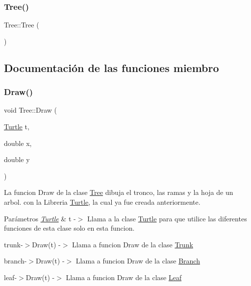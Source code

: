 \subsubsection{\texorpdfstring{Tree()}{Tree()}}
{\footnotesize\ttfamily Tree\+::\+Tree (\begin{DoxyParamCaption}{ }\end{DoxyParamCaption})\hspace{0.3cm}{\ttfamily [inline]}}



\subsection{Documentación de las funciones miembro}
\mbox{\label{class_tree_a76dc7e174c3c98b7e3b3839cdafa8a92}} 
\subsubsection{\texorpdfstring{Draw()}{Draw()}}
{\footnotesize\ttfamily void Tree\+::\+Draw (\begin{DoxyParamCaption}\item[{\mbox{\hyperlink{class_turtle}{Turtle}}}]{t,  }\item[{double}]{x,  }\item[{double}]{y }\end{DoxyParamCaption})\hspace{0.3cm}{\ttfamily [inline]}}



La funcion Draw de la clase \mbox{\hyperlink{class_tree}{Tree}} dibuja el tronco, las ramas y la hoja de un arbol. con la Libreria \mbox{\hyperlink{class_turtle}{Turtle}}, la cual ya fue creada anteriormente. 


\begin{DoxyParams}{Parámetros}
{\em \mbox{\hyperlink{class_turtle}{Turtle}}} & t -\/$>$ Llama a la clase \mbox{\hyperlink{class_turtle}{Turtle}} para que utilice las diferentes funciones de esta clase solo en esta funcion. \\
\hline
\end{DoxyParams}
trunk-\/$>$Draw(t) -\/$>$ Llama a funcion Draw de la clase \mbox{\hyperlink{class_trunk}{Trunk}}

branch-\/$>$Draw(t) -\/$>$ Llama a funcion Draw de la clase \mbox{\hyperlink{class_branch}{Branch}}

leaf-\/$>$Draw(t) -\/$>$ Llama a funcion Draw de la clase \mbox{\hyperlink{class_leaf}{Leaf}} \mbox{\label{class_tree_a63989c4c8644b423c54923a77a502020}} 
